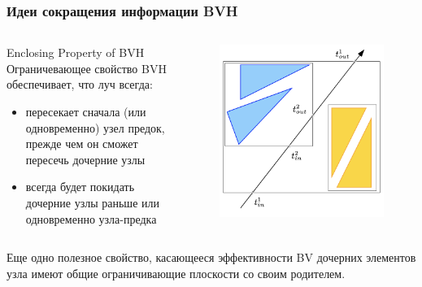\documentclass{beamer}
\begin{document}
\begin{frame}[t]
    \frametitle{Идеи сокращения информации BVH}

    \begin{columns}
        \begin{block}{Enclosing Property of BVH}
            Ограничевающее свойство BVH обеспечивает,
            что луч всегда:
            \begin{itemize}
                \item
                    пересекает сначала (или одновременно) узел предок, прежде чем он
                    сможет пересечь дочерние узлы
                \item
                    всегда будет покидать дочерние узлы
                    раньше или одновременно узла-предка
            \end{itemize}
        \end{block}

        \begin{figure}
            \includegraphics[keepaspectratio, width=\textwidth]{res/enclosing.png}
        \end{figure}
    \end{columns}

    \begin{block}{Еще одно полезное свойство, касающееся эффективности}
        BV дочерних элементов узла имеют общие ограничивающие плоскости со своим родителем.
    \end{block}

\end{frame}




\end{document}
